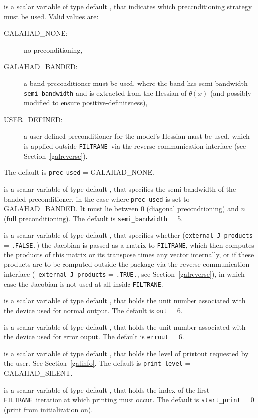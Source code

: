 \documentclass{galahad}
\newcommand{\packagename}{FILTRANE}
\newcommand{\sym}{\sf\small}
\newcommand{\filtrane}{{\tt \packagename}}
\begin{document}
\begin{description}
 is a scalar variable of type default \integer, that indicates
which preconditioning strategy must be used. Valid values are:
\begin{description}
\item[\sym GALAHAD\_NONE:] no preconditioning,
\item[\sym GALAHAD\_BANDED:] a band preconditioner must be used, where the
band has semi-bandwidth {\tt semi\_bandwidth} and is extracted from
the Hessian of $\theta(x)$ (and possibly modified to ensure
positive-definiteness),
\item[\sym USER\_DEFINED:] a user-defined preconditioner for the model's
Hessian must be used, which is applied outside \filtrane\ via the reverse
communication interface (see Section~\ref{galreverse}).
\end{description}
The default is {\tt prec\_used} = {\sym GALAHAD\_NONE}.

 is a scalar variable of type default \integer, that
specifies the semi-bandwidth of the banded preconditioner, in the case where
{\tt prec\_used} is set to {\sym GALAHAD\_BANDED}. It must lie between
0 (diagonal precondtioning) and $n$ (full preconditioning).
The default is {\tt semi\_bandwidth} = 5.

 is a scalar variable of type default \logical, that
specifies whether ({\tt external\_J\_products} = {\tt .FALSE.}) the Jacobian
is passed as a matrix to \filtrane, which then computes the products of this
matrix or its transpose times any vector internally, or if these products are
to be computed outside the package via the reverse communication interface ({\tt
external\_J\_products} = {\tt .TRUE.}, see Section~\ref{galreverse}), in which
case the Jacobian is not used at all inside \filtrane.

 is a scalar variable of type default \integer, that holds the
unit number associated with the device used for normal output.
The default is {\tt out} = 6.

 is a scalar variable of type default \integer, that holds the
unit number associated with the device used for error ouput.
The default is {\tt errout} = 6.

 is a scalar variable of type default \integer, that holds the
level of printout requested by the user. See Section~\ref{galinfo}.
The default is {\tt print\_level} = {\sym GALAHAD\_SILENT}.

 is a scalar variable of type default \integer, that holds
the index of the first \filtrane\ iteration at which printing must occur.
The default is {\tt start\_print} = 0 (print from initialization on).


\end{description}
\end{document}
